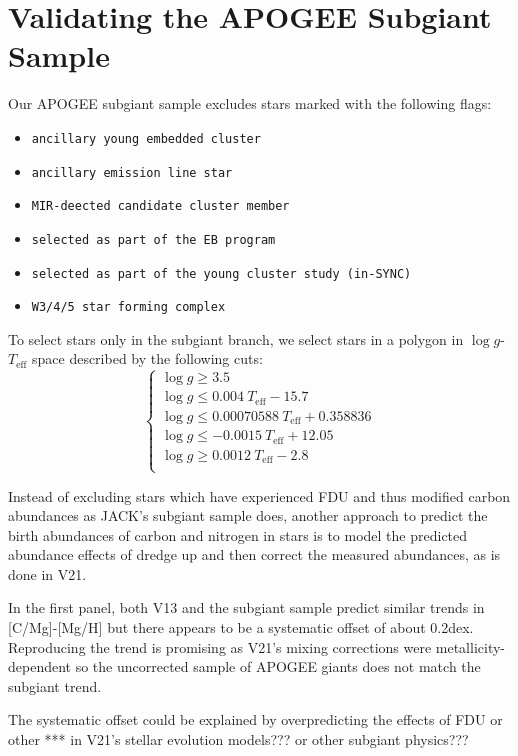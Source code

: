 \documentclass[fleqn,usenatbib]{mnras}
\begin{document}
\section{Validating the APOGEE Subgiant Sample}\label{sec:jack}
Our APOGEE subgiant sample excludes stars marked with the following flags:
\begin{itemize}
\item \texttt{ancillary young embedded cluster}
\item \texttt{ancillary emission line star}
\item \texttt{MIR-deected candidate cluster member}
\item \texttt{selected as part of the EB program}
\item \texttt{selected as part of the young cluster study (in-SYNC)}
\item \texttt{W3/4/5 star forming complex}
\end{itemize}

To select stars only in the subgiant branch, we select stars in a polygon in $\log g$-$T_\text{eff}$ space described by the following cuts:
\begin{equation}
\begin{cases}
\log g \geq 3.5 \\
\log g \leq 0.004\ T_\text{eff} - 15.7 \\
\log g \leq 0.00070588\ T_\text{eff} + 0.358836 \\
\log g \leq -0.0015\ T_\text{eff} + 12.05 \\
\log g \geq 0.0012\ T_\text{eff} - 2.8 \\
\end{cases}
\end{equation}

Instead of excluding stars which have experienced FDU and thus modified carbon abundances as JACK's subgiant sample does, another approach to predict the birth abundances of carbon and nitrogen in stars is to model the predicted abundance effects of dredge up and then correct the measured abundances, as is done in V21. 

In the first panel, both V13 and the subgiant sample predict similar trends in [C/Mg]-[Mg/H] but there appears to be a systematic offset of about 0.2dex. Reproducing the trend is promising as V21's mixing corrections were metallicity-dependent so the uncorrected sample of APOGEE giants does not match the subgiant trend. 

The systematic offset could be explained by overpredicting the effects of FDU or other *** in V21's stellar evolution models??? or other subgiant physics???
\end{document}
